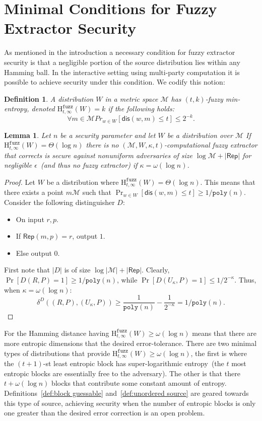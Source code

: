\documentclass[11pt]{article}
\newcommand{\class}[1]{{\ensuremath{\mathsf{#1}}}}
\newcommand{\rep}{\ensuremath{\class{Rep}}\xspace}
\newcommand{\dis}{\ensuremath{\mathsf{dis}}}
\newcommand{\poly}{\ensuremath{\mathtt{poly}}\xspace}
\newcommand{\Hfuzz}{\mathrm{H}^{\mathtt{fuzz}}_{t,\infty}}
\newtheorem{lemma}[theorem]{Lemma}
\newtheorem{definition}[theorem]{Definition}
\begin{document}
\section{Minimal Conditions for Fuzzy Extractor Security}
\label{sec:minimal conditions}
As mentioned in the introduction a necessary condition for fuzzy extractor security is that a negligible portion of the source distribution lies within any Hamming ball.  In the interactive setting using multi-party computation it is possible to achieve security under this condition.  We codify this notion:

\begin{definition}
\label{def:fuzzy min-ent}
A distribution $W$ in a metric space $\mathcal{M}$ has $(t, k)$-fuzzy min-entropy, denoted $\Hfuzz(W) = k$ if the following holds:
\[
\forall m\in \mathcal{M} Pr_{w\in W}[\dis(w, m) \leq t] \leq 2^{-k}.
\]
\end{definition}
\begin{lemma}
Let $n$ be a security parameter and let $W$ be a distribution over $\mathcal{M}$
If $\Hfuzz (W) = \Theta(\log n)$ there is no $(\mathcal{M}, W, \kappa, t)$-computational fuzzy extractor that corrects is secure against nonuniform adversaries of size $\log \mathcal{M} + |\rep|$ for negligible $\epsilon$~(and thus no fuzzy extractor) if $\kappa =\omega(\log n)$.
\end{lemma}
\begin{proof}
Let $W$ be a distribution where $\Hfuzz(W) = \Theta(\log n)$.  This means that there exists a point $m\mathcal{M}$ such that $\Pr_{w\in W}[\dis (w, m)\leq t] \geq 1/\poly(n)$.  Consider the following distinguisher $D$:
\begin{itemize}
\item On input $r, p$.
\item If $\rep(m, p) = r$, output $1$.
\item Else output $0$.
\end{itemize}
First note that $|D|$ is of size $\log |\mathcal{M}|+ |\rep|$.  Clearly, $\Pr[D(R, P) = 1]\geq 1/\poly(n)$, while $\Pr[D(U_\kappa, P)=1 ]\leq 1/2^{-\kappa}$.  Thus, when $\kappa = \omega(\log n)$:
\[
\delta^D((R, P), (U_\kappa, P))\geq \frac{1}{\poly(n)} - \frac{1}{2^{-\kappa}} = 1/\poly(n).
\]
\end{proof}

For the Hamming distance having $\Hfuzz(W)\geq \omega(\log n)$ means that there are more entropic dimensions that the desired error-tolerance.  There are two minimal types of distributions that provide $\Hfuzz(W)\geq \omega(\log n)$, the first is where the $(t+1)$-st least entropic block has super-logarithmic entropy~(the $t$ most entropic blocks are essentially free to the adversary).  The other is that there $t+\omega(\log n)$ blocks that contribute some constant amount of entropy.  Definitions~\ref{def:block guessable} and~\ref{def:unordered source} are geared towards this type of source, achieving security when the number of entropic blocks is only one greater than the desired error correction is an open problem.
\end{document}
